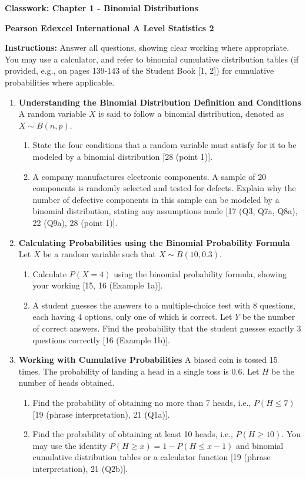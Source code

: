 \documentclass[12pt]{article}
\begin{document}
\centerline{\Large\textbf{Classwork: Chapter 1 - Binomial Distributions}}
\centerline{\textbf{Pearson Edexcel International A Level Statistics 2}}
\vspace{0.5cm}

\textbf{Instructions:} Answer all questions, showing clear working where appropriate. You may use a calculator, and refer to binomial cumulative distribution tables (if provided, e.g., on pages 139-143 of the Student Book [1, 2]) for cumulative probabilities where applicable.

\vspace{0.5cm}

\begin{enumerate}
    \item \textbf{Understanding the Binomial Distribution Definition and Conditions}
    A random variable $X$ is said to follow a binomial distribution, denoted as $X \sim B(n, p)$.
    \begin{enumerate}
        \item State the four conditions that a random variable must satisfy for it to be modeled by a binomial distribution [28 (point 1)].
        \item A company manufactures electronic components. A sample of 20 components is randomly selected and tested for defects. Explain why the number of defective components in this sample can be modeled by a binomial distribution, stating any assumptions made [17 (Q3, Q7a, Q8a), 22 (Q9a), 28 (point 1)].
    \end{enumerate}

    \item \textbf{Calculating Probabilities using the Binomial Probability Formula}
    Let $X$ be a random variable such that $X \sim B(10, 0.3)$.
    \begin{enumerate}
        \item Calculate $P(X = 4)$ using the binomial probability formula, showing your working [15, 16 (Example 1a)].
        \item A student guesses the answers to a multiple-choice test with 8 questions, each having 4 options, only one of which is correct. Let $Y$ be the number of correct answers. Find the probability that the student guesses exactly 3 questions correctly [16 (Example 1b)].
    \end{enumerate}

    \item \textbf{Working with Cumulative Probabilities}
    A biased coin is tossed 15 times. The probability of landing a head in a single toss is $0.6$. Let $H$ be the number of heads obtained.
    \begin{enumerate}
        \item Find the probability of obtaining no more than 7 heads, i.e., $P(H \le 7)$ [19 (phrase interpretation), 21 (Q1a)].
        \item Find the probability of obtaining at least 10 heads, i.e., $P(H \ge 10)$. You may use the identity $P(H \ge x) = 1 - P(H \le x-1)$ and binomial cumulative distribution tables or a calculator function [19 (phrase interpretation), 21 (Q2b)].
    \end{enumerate}


\end{enumerate}
\end{document}
